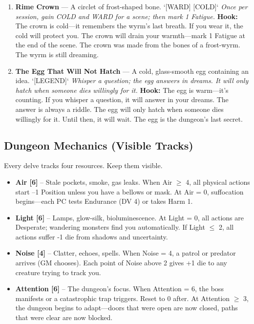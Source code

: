 \begin{enumerate}
\item[K] \textbf{Rime Crown} --- A circlet of frost-shaped bone. `[WARD] [COLD]`
  \hfill \textit{Once per session, gain COLD and WARD for a scene; then mark 1 Fatigue.}
  \textbf{Hook:} The crown is cold---it remembers the wyrm's last breath. If you wear it, the cold will protect you. The crown will drain your warmth---mark 1 Fatigue at the end of the scene. The crown was made from the bones of a frost-wyrm. The wyrm is still dreaming.

\item[A] \textbf{The Egg That Will Not Hatch} --- A cold, glass-smooth egg containing an idea. `[LEGEND]`
  \hfill \textit{Whisper a question; the egg answers in dreams. It will only hatch when someone dies willingly for it.}
  \textbf{Hook:} The egg is warm---it's counting. If you whisper a question, it will answer in your dreams. The answer is always a riddle. The egg will only hatch when someone dies willingly for it. Until then, it will wait. The egg is the dungeon's last secret.
\end{enumerate}

\subsection*{Dungeon Mechanics (Visible Tracks)}

Every delve tracks four resources. Keep them visible.

\begin{itemize}
    \item \textbf{Air [6]} -- Stale pockets, smoke, gas leaks. When Air $\geq$ 4, all physical actions start --1 Position unless you have a bellows or mask. At Air = 0, suffocation begins---each PC tests Endurance (DV 4) or takes Harm 1.
    \item \textbf{Light [6]} -- Lamps, glow-silk, bioluminescence. At Light = 0, all actions are Desperate; wandering monsters find you automatically. If Light $\leq$ 2, all actions suffer -1 die from shadows and uncertainty.
    \item \textbf{Noise [4]} -- Clatter, echoes, spells. When Noise = 4, a patrol or predator arrives (GM chooses). Each point of Noise above 2 gives +1 die to any creature trying to track you.
    \item \textbf{Attention [6]} -- The dungeon's focus. When Attention = 6, the boss manifests or a catastrophic trap triggers. Reset to 0 after. At Attention $\geq$ 3, the dungeon begins to adapt---doors that were open are now closed, paths that were clear are now blocked.
\end{itemize}


